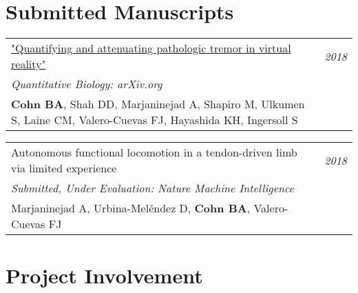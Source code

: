 \documentclass[10pt,a4paper]{article}
\begin{document}
\vspace*{3mm}\section*{Submitted Manuscripts} 

\vspace*{1mm}\noindent\begin{tabularx}{17cm}{X r}
  \href{https://arxiv.org/pdf/1809.05970.pdf}{"Quantifying and attenuating pathologic tremor in virtual reality"} & \textit{2018} \\ %
  \textit{Quantitative Biology: arXiv.org} \\
  \textbf{Cohn BA}, Shah DD, Marjaninejad A, Shapiro M, Ulkumen S, Laine CM, Valero-Cuevas FJ, Hayashida KH, Ingersoll S \\[2mm]
\end{tabularx}

\vspace*{4mm}\noindent\begin{tabularx}{17cm}{X r}
  Autonomous functional locomotion in a tendon-driven limb via limited experience & \textit{2018} \\ %
  \textit{Submitted, Under Evaluation: Nature Machine Intelligence} \\
  Marjaninejad A, Urbina-Mel\'{e}ndez D, \textbf{Cohn BA}, Valero-Cuevas FJ \\[2mm]

\end{tabularx} 


\vspace*{3mm}\section*{Project Involvement}
\end{document}
